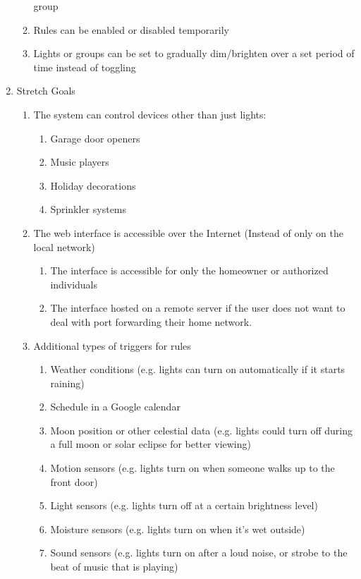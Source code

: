\begin{enumerate}
\begin{enumerate}
            group
        \item Rules can be enabled or disabled temporarily
        \item Lights or groups can be set to gradually dim/brighten over a set
            period of time instead of toggling
    \end{enumerate}
    \item Stretch Goals
    \begin{enumerate}
        \item The system can control devices other than just lights:
        \begin{enumerate}
            \item Garage door openers
            \item Music players
            \item Holiday decorations
            \item Sprinkler systems
        \end{enumerate}
        \item The web interface is accessible over the Internet (Instead of
            only on the local network)
        \begin{enumerate}
            \item The interface is accessible for only the homeowner or
                authorized individuals
            \item The interface hosted on a remote server if the user does not
                want to deal with port forwarding their home network.
        \end{enumerate}
        \item Additional types of triggers for rules
        \begin{enumerate}
            \item Weather conditions (e.g. lights can turn on automatically if
                it starts raining)
            \item Schedule in a Google calendar
            \item Moon position or other celestial data (e.g. lights could turn
                off during a full moon or solar eclipse for better viewing)
            \item Motion sensors (e.g. lights turn on when someone walks up to
                the front door)
            \item Light sensors (e.g. lights turn off at a certain brightness
                level)
            \item Moisture sensors (e.g. lights turn on when it's wet outside)
            \item Sound sensors (e.g. lights turn on after a loud noise, or
                strobe to the beat of music that is playing)
        \end{enumerate}
    \end{enumerate}
\end{enumerate}

